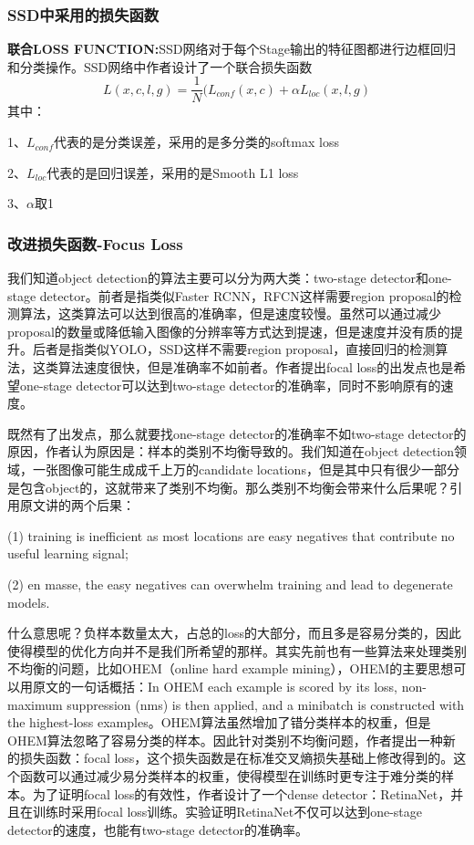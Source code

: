 \subsubsection{SSD中采用的损失函数}
\textbf{联合LOSS FUNCTION:}SSD网络对于每个Stage输出的特征图都进行边框回归和分类操作。SSD网络中作者设计了一个联合损失函数
\[
	L(x,c,l,g) = \frac{1}{N}(L_{conf}(x,c) + \alpha L_{loc}(x,l,g)
\]
其中：

 1、$L_{conf}$代表的是分类误差，采用的是多分类的softmax loss
 
 2、$L_{loc}$代表的是回归误差，采用的是Smooth L1 loss
 
 3、$\alpha$取1
\subsubsection{改进损失函数-Focus Loss}
我们知道object detection的算法主要可以分为两大类：two-stage detector和one-stage detector。前者是指类似Faster RCNN，RFCN这样需要region proposal的检测算法，这类算法可以达到很高的准确率，但是速度较慢。虽然可以通过减少proposal的数量或降低输入图像的分辨率等方式达到提速，但是速度并没有质的提升。后者是指类似YOLO，SSD这样不需要region proposal，直接回归的检测算法，这类算法速度很快，但是准确率不如前者。作者提出focal loss的出发点也是希望one-stage detector可以达到two-stage detector的准确率，同时不影响原有的速度。

既然有了出发点，那么就要找one-stage detector的准确率不如two-stage detector的原因，作者认为原因是：样本的类别不均衡导致的。我们知道在object detection领域，一张图像可能生成成千上万的candidate locations，但是其中只有很少一部分是包含object的，这就带来了类别不均衡。那么类别不均衡会带来什么后果呢？引用原文讲的两个后果：

(1) training is inefficient as most locations are easy negatives that contribute no useful learning signal; 

(2) en masse, the easy negatives can overwhelm training and lead to degenerate models. 

什么意思呢？负样本数量太大，占总的loss的大部分，而且多是容易分类的，因此使得模型的优化方向并不是我们所希望的那样。其实先前也有一些算法来处理类别不均衡的问题，比如OHEM（online hard example mining），OHEM的主要思想可以用原文的一句话概括：In OHEM each example is scored by its loss, non-maximum suppression (nms) is then applied, and a minibatch is constructed with the highest-loss examples。OHEM算法虽然增加了错分类样本的权重，但是OHEM算法忽略了容易分类的样本。因此针对类别不均衡问题，作者提出一种新的损失函数：focal loss，这个损失函数是在标准交叉熵损失基础上修改得到的。这个函数可以通过减少易分类样本的权重，使得模型在训练时更专注于难分类的样本。为了证明focal loss的有效性，作者设计了一个dense detector：RetinaNet，并且在训练时采用focal loss训练。实验证明RetinaNet不仅可以达到one-stage detector的速度，也能有two-stage detector的准确率。

